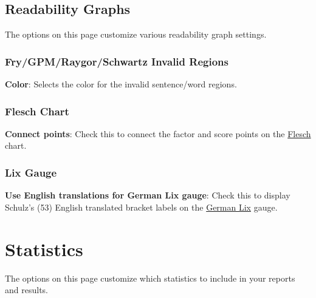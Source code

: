 \documentclass[
]{book}
\theoremstyle{definition}
\theoremstyle{definition}
\theoremstyle{definition}
\theoremstyle{definition}
\theoremstyle{remark}
\begin{document}
\hypertarget{options-readability-graphs}{%
\subsection*{Readability Graphs}\label{options-readability-graphs}}

The options on this page customize various readability graph settings.

\hypertarget{frygpmraygorschwartz-invalid-regions}{%
\subsubsection*{Fry/GPM/Raygor/Schwartz Invalid Regions}\label{frygpmraygorschwartz-invalid-regions}}

\textbf{Color}: Selects the color for the invalid sentence/word regions.

\hypertarget{options-flesch-chart}{%
\subsubsection*{Flesch Chart}\label{options-flesch-chart}}

\textbf{Connect points}: Check this to connect the factor and score points on the \protect\hyperlink{flesch-test}{Flesch} chart.

\hypertarget{options-lix-gauge}{%
\subsubsection*{Lix Gauge}\label{options-lix-gauge}}

\textbf{Use English translations for German Lix gauge}: Check this to display Schulz's (53) English translated bracket labels on the \protect\hyperlink{lix-german-technical}{German Lix} gauge.

\newpage

\hypertarget{options-statistics}{%
\section{Statistics}\label{options-statistics}}

The options on this page customize which statistics to include in your reports and results.
\end{document}
